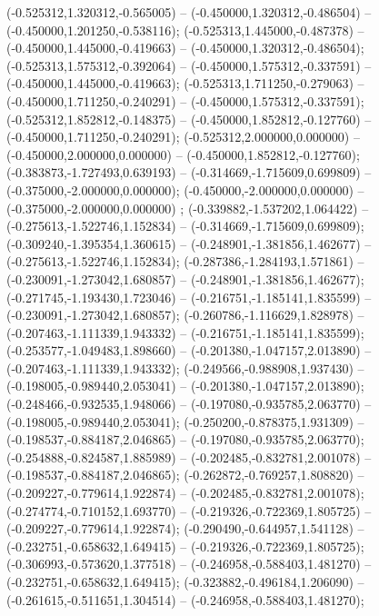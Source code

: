  (-0.525312,1.320312,-0.565005) -- (-0.450000,1.320312,-0.486504) -- (-0.450000,1.201250,-0.538116);
 (-0.525313,1.445000,-0.487378) -- (-0.450000,1.445000,-0.419663) -- (-0.450000,1.320312,-0.486504);
 (-0.525313,1.575312,-0.392064) -- (-0.450000,1.575312,-0.337591) -- (-0.450000,1.445000,-0.419663);
 (-0.525313,1.711250,-0.279063) -- (-0.450000,1.711250,-0.240291) -- (-0.450000,1.575312,-0.337591);
 (-0.525312,1.852812,-0.148375) -- (-0.450000,1.852812,-0.127760) -- (-0.450000,1.711250,-0.240291);
 (-0.525312,2.000000,0.000000) -- (-0.450000,2.000000,0.000000) -- (-0.450000,1.852812,-0.127760);
 (-0.383873,-1.727493,0.639193) -- (-0.314669,-1.715609,0.699809) -- (-0.375000,-2.000000,0.000000);
 (-0.450000,-2.000000,0.000000) -- (-0.375000,-2.000000,0.000000) ;
 (-0.339882,-1.537202,1.064422) -- (-0.275613,-1.522746,1.152834) -- (-0.314669,-1.715609,0.699809);
 (-0.309240,-1.395354,1.360615) -- (-0.248901,-1.381856,1.462677) -- (-0.275613,-1.522746,1.152834);
 (-0.287386,-1.284193,1.571861) -- (-0.230091,-1.273042,1.680857) -- (-0.248901,-1.381856,1.462677);
 (-0.271745,-1.193430,1.723046) -- (-0.216751,-1.185141,1.835599) -- (-0.230091,-1.273042,1.680857);
 (-0.260786,-1.116629,1.828978) -- (-0.207463,-1.111339,1.943332) -- (-0.216751,-1.185141,1.835599);
 (-0.253577,-1.049483,1.898660) -- (-0.201380,-1.047157,2.013890) -- (-0.207463,-1.111339,1.943332);
 (-0.249566,-0.988908,1.937430) -- (-0.198005,-0.989440,2.053041) -- (-0.201380,-1.047157,2.013890);
 (-0.248466,-0.932535,1.948066) -- (-0.197080,-0.935785,2.063770) -- (-0.198005,-0.989440,2.053041);
 (-0.250200,-0.878375,1.931309) -- (-0.198537,-0.884187,2.046865) -- (-0.197080,-0.935785,2.063770);
 (-0.254888,-0.824587,1.885989) -- (-0.202485,-0.832781,2.001078) -- (-0.198537,-0.884187,2.046865);
 (-0.262872,-0.769257,1.808820) -- (-0.209227,-0.779614,1.922874) -- (-0.202485,-0.832781,2.001078);
 (-0.274774,-0.710152,1.693770) -- (-0.219326,-0.722369,1.805725) -- (-0.209227,-0.779614,1.922874);
 (-0.290490,-0.644957,1.541128) -- (-0.232751,-0.658632,1.649415) -- (-0.219326,-0.722369,1.805725);
 (-0.306993,-0.573620,1.377518) -- (-0.246958,-0.588403,1.481270) -- (-0.232751,-0.658632,1.649415);
 (-0.323882,-0.496184,1.206090) -- (-0.261615,-0.511651,1.304514) -- (-0.246958,-0.588403,1.481270);
